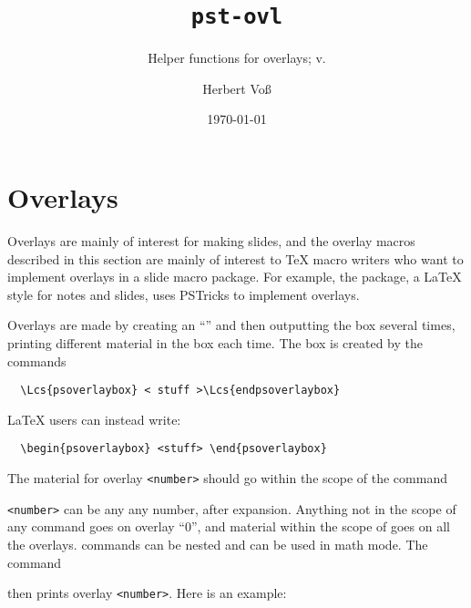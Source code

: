 \documentclass[11pt,english,BCOR10mm,DIV12,bibliography=totoc,parskip=false,
   smallheadings, headexclude,footexclude,oneside]{pst-doc}
\let\pstOVLFV\fileversion
\begin{document}
\title{\texttt{pst-ovl}}
\subtitle{Helper functions for overlays; v.\pstOVLFV}
\author{Herbert Vo\ss}
\docauthor{}
\date{\today}
\maketitle

\tableofcontents
{}

\section{Overlays}

Overlays are mainly of interest for making slides, and the overlay macros
described in this section are mainly of interest to \TeX{} macro writers who
want to implement overlays in a slide macro package.  For example, the
 package, a \LaTeX{} style for notes and slides, uses PSTricks to
implement overlays.

Overlays are made by creating an "`"' and then outputting the box several
times, printing different material in the box each time. The box is created by
the commands
\begin{lstlisting}
  \Lcs{psoverlaybox} < stuff >\Lcs{endpsoverlaybox}
\end{lstlisting}
\LaTeX{} users can instead write:
\begin{lstlisting}
  \begin{psoverlaybox} <stuff> \end{psoverlaybox}
\end{lstlisting}

The material for overlay \texttt{<number>} should go within the scope of the command


\texttt{<number>} can be any any number, after expansion. Anything not in the scope of any
 command goes on overlay "`0"', and material within the scope of
 goes on all the overlays. 
commands can be nested and can be used in math mode.
The command


then prints overlay \texttt{<number>}.
%
Here is an example:

\begin{LTXexample}[pos=t]
\psoverlaybox
{}
 \endpsoverlaybox

 \hspace{.5in} 
\end{LTXexample}
\end{document}
